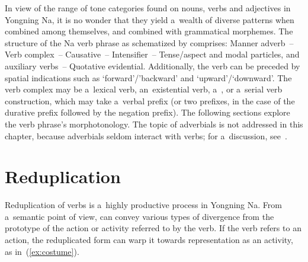 In view of the range of tone categories found on nouns, verbs and adjectives in Yongning Na, it is
no wonder that they yield a~wealth of diverse patterns when combined among themselves, and combined
with grammatical morphemes. The structure of the Na verb phrase as schematized by \citet[350–351]{lidz2010} comprises: Manner
adverb~-- Verb complex~-- Causative~-- Intensifier~-- Tense/aspect and modal particles, and auxiliary
verbs~-- Quotative evidential. Additionally, the verb can be preceded by spatial indications such as
‘forward’/’backward’ and ‘upward’/‘downward’. The verb complex may be a~lexical verb, an~existential
verb, a~, or a~serial verb construction, which may take a~verbal prefix (or two prefixes, in the
case of the {durative} prefix followed by the {negation} prefix). The following sections explore the verb phrase's morphotonology. The topic of adverbials is not addressed in this chapter, because adverbials seldom interact with verbs; for a~discussion, see~.

\section{Reduplication}
\label{sec:reduplication}

Reduplication of verbs is a~highly productive process in Yongning Na. From a~semantic point of view,  can convey various types of divergence from the prototype of the action or activity referred to by the verb. If the verb refers to an action, the reduplicated form can warp it towards representation as an activity, as in~(\ref{ex:costume}).  

